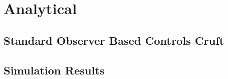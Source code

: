 
\chapter{Analytical}
\label{chap:Analytical}

\section{Standard Observer Based Controls Cruft}
\label{sec:StandardObserverBasedControlsCruft}

\section{Simulation Results}
\label{sec:SimulationResults}


